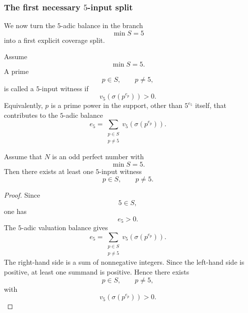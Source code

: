 \subsubsection{The first necessary $5$-input split}

We now turn the $5$-adic balance in the branch
\[
  \min S=5
\]
into a first explicit coverage split.

\begin{definition}[$5$-input witness in the branch $\min S=5$]
Assume
\[
  \min S=5.
\]
A prime
\[
  p\in S,\qquad p\ne5,
\]
is called a $5$-input witness if
\[
  v_5(\sigma(p^{e_p}))>0.
\]
Equivalently, $p$ is a prime power in the support, other than $5^{e_5}$ itself,
that contributes to the $5$-adic balance
\[
  e_5
  =
  \sum_{\substack{p\in S\\p\ne5}}
  v_5(\sigma(p^{e_p})).
\]
\end{definition}

\begin{proposition}
\label{prop:q5-input-witness-exists}
Assume that $N$ is an odd perfect number with
\[
  \min S=5.
\]
Then there exists at least one $5$-input witness
\[
  p\in S,\qquad p\ne5.
\]
\end{proposition}

\begin{proof}
Since
\[
  5\in S,
\]
one has
\[
  e_5>0.
\]
The $5$-adic valuation balance gives
\[
  e_5
  =
  \sum_{\substack{p\in S\\p\ne5}}
  v_5(\sigma(p^{e_p})).
\]
The right-hand side is a sum of nonnegative integers.  Since the left-hand side
is positive, at least one summand is positive.  Hence there exists
\[
  p\in S,\qquad p\ne5,
\]
with
\[
  v_5(\sigma(p^{e_p}))>0.
\]
\end{proof}

